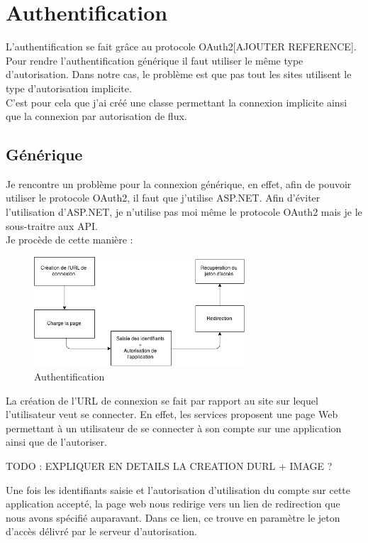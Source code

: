 \documentclass[11pt]{report} %
\begin{document}
	\newpage
	\section{Authentification}
	L'authentification se fait grâce au protocole OAuth2[AJOUTER REFERENCE]. Pour rendre l'authentification générique il faut utiliser le même type d'autorisation. Dans notre cas, le problème est que pas tout les sites utilisent le type d'autorisation implicite.\\
	C'est pour cela que j'ai créé une classe permettant la connexion implicite ainsi que la connexion par autorisation de flux.
	
	\subsection{Générique}
	Je rencontre un problème pour la connexion générique, en effet, afin de pouvoir utiliser le protocole OAuth2, il faut que j'utilise ASP.NET. 
	Afin d'éviter l'utilisation d'ASP.NET, je n'utilise pas moi même le protocole OAuth2 mais je le sous-traitre aux API.\\
	Je procède de cette manière :
	
			\begin{figure}[h]
				\center
				\includegraphics[width=0.7\textwidth]{../img/auth.png}
				\caption{Authentification}
				\label{authentification}
			\end{figure}
	
	
	La création de l'URL de connexion se fait par rapport au site sur lequel l'utilisateur veut se connecter. En effet, les services proposent une page Web permettant à un utilisateur de se connecter à son compte sur une application ainsi que de l'autoriser.
	
	TODO : EXPLIQUER EN DETAILS LA CREATION DURL + IMAGE ?
	
	Une fois les identifiants saisie et l'autorisation d'utilisation du compte sur cette application accepté, la page web nous redirige vers un lien de redirection que nous avons spécifié auparavant. Dans ce lien, ce trouve en paramètre le jeton d'accès délivré par le serveur d'autorisation.
\end{document}
